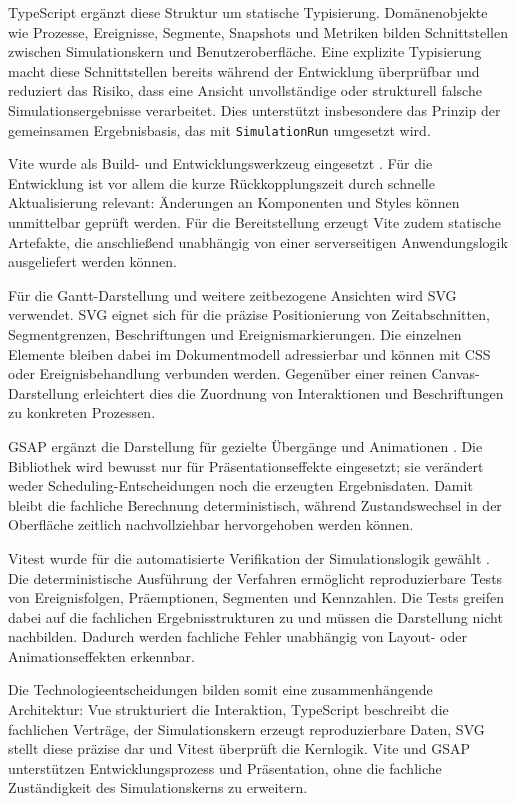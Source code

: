 TypeScript ergänzt diese Struktur um statische Typisierung. Domänenobjekte wie Prozesse, Ereignisse, Segmente, Snapshots und Metriken bilden Schnittstellen zwischen Simulationskern und Benutzeroberfläche. Eine explizite Typisierung macht diese Schnittstellen bereits während der Entwicklung überprüfbar und reduziert das Risiko, dass eine Ansicht unvollständige oder strukturell falsche Simulationsergebnisse verarbeitet. Dies unterstützt insbesondere das Prinzip der gemeinsamen Ergebnisbasis, das mit \texttt{SimulationRun} umgesetzt wird.

Vite wurde als Build- und Entwicklungswerkzeug eingesetzt \cite{vitedocs}. Für die Entwicklung ist vor allem die kurze Rückkopplungszeit durch schnelle Aktualisierung relevant: Änderungen an Komponenten und Styles können unmittelbar geprüft werden. Für die Bereitstellung erzeugt Vite zudem statische Artefakte, die anschließend unabhängig von einer serverseitigen Anwendungslogik ausgeliefert werden können.

Für die Gantt-Darstellung und weitere zeitbezogene Ansichten wird SVG verwendet. SVG eignet sich für die präzise Positionierung von Zeitabschnitten, Segmentgrenzen, Beschriftungen und Ereignismarkierungen. Die einzelnen Elemente bleiben dabei im Dokumentmodell adressierbar und können mit CSS oder Ereignisbehandlung verbunden werden. Gegenüber einer reinen Canvas-Darstellung erleichtert dies die Zuordnung von Interaktionen und Beschriftungen zu konkreten Prozessen.

GSAP ergänzt die Darstellung für gezielte Übergänge und Animationen \cite{gsapdocs}. Die Bibliothek wird bewusst nur für Präsentationseffekte eingesetzt; sie verändert weder Scheduling-Entscheidungen noch die erzeugten Ergebnisdaten. Damit bleibt die fachliche Berechnung deterministisch, während Zustandswechsel in der Oberfläche zeitlich nachvollziehbar hervorgehoben werden können.

Vitest wurde für die automatisierte Verifikation der Simulationslogik gewählt \cite{vitestdocs}. Die deterministische Ausführung der Verfahren ermöglicht reproduzierbare Tests von Ereignisfolgen, Präemptionen, Segmenten und Kennzahlen. Die Tests greifen dabei auf die fachlichen Ergebnisstrukturen zu und müssen die Darstellung nicht nachbilden. Dadurch werden fachliche Fehler unabhängig von Layout- oder Animationseffekten erkennbar.

Die Technologieentscheidungen bilden somit eine zusammenhängende Architektur: Vue strukturiert die Interaktion, TypeScript beschreibt die fachlichen Verträge, der Simulationskern erzeugt reproduzierbare Daten, SVG stellt diese präzise dar und Vitest überprüft die Kernlogik. Vite und GSAP unterstützen Entwicklungsprozess und Präsentation, ohne die fachliche Zuständigkeit des Simulationskerns zu erweitern.

